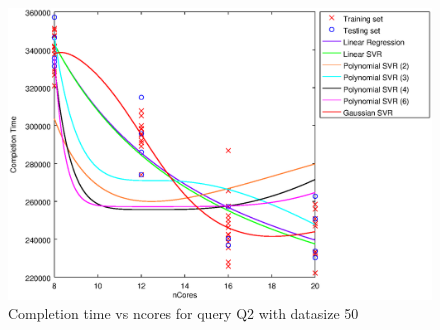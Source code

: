 
\begin {figure}[hbtp]
\centering
\includegraphics[width=\textwidth]{output/Q2_50_ONLY_1_OVER_NCORES/plot_Q2_50.eps}
\caption{Completion time vs ncores for query Q2 with datasize 50}
\label{fig:all_linear_Q2_50}
\end {figure}
